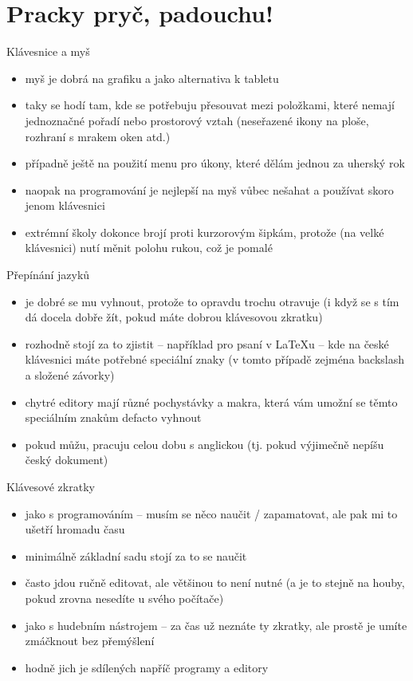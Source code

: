\documentclass{beamer}
\begin{document}
\section{Pracky pryč, padouchu!}

\begin{frame}{Klávesnice a myš}
  \begin{itemize}
    \item myš je dobrá na grafiku a jako alternativa k tabletu
    \item taky se hodí tam, kde se potřebuju přesouvat mezi položkami, které nemají jednoznačné pořadí nebo prostorový vztah (neseřazené ikony na ploše, rozhraní s mrakem oken atd.)
    \item případně ještě na použití menu pro úkony, které dělám jednou za uherský rok
    \item naopak na programování je nejlepší na myš vůbec nešahat a používat skoro jenom klávesnici
    \item extrémní školy dokonce brojí proti kurzorovým šipkám, protože (na velké klávesnici) nutí měnit polohu rukou, což je pomalé
  \end{itemize}
\end{frame}

\begin{frame}{Přepínání jazyků}
  \begin{itemize}
    \item je dobré se mu vyhnout, protože to opravdu trochu otravuje (i když se s tím dá docela dobře žít, pokud máte dobrou klávesovou zkratku)
    \item rozhodně stojí za to zjistit -- například pro psaní v LaTeXu -- kde na české klávesnici máte potřebné speciální znaky (v tomto případě zejména backslash a složené závorky)
    \item chytré editory mají různé pochystávky a makra, která vám umožní se těmto speciálním znakům defacto vyhnout
    \item pokud můžu, pracuju celou dobu s anglickou (tj. pokud výjimečně nepíšu český dokument)
  \end{itemize}
\end{frame}

\begin{frame}{Klávesové zkratky}
  \begin{itemize}
    \item jako s programováním -- musím se něco naučit / zapamatovat, ale pak mi to ušetří hromadu času
    \item minimálně základní sadu stojí za to se naučit
    \item často jdou ručně editovat, ale většinou to není nutné (a je to stejně na houby, pokud zrovna nesedíte u svého počítače)
    \item jako s hudebním nástrojem -- za čas už neznáte ty zkratky, ale prostě je umíte zmáčknout bez přemýšlení
    \item hodně jich je sdílených napříč programy a editory
  \end{itemize}
\end{frame}
\end{document}
